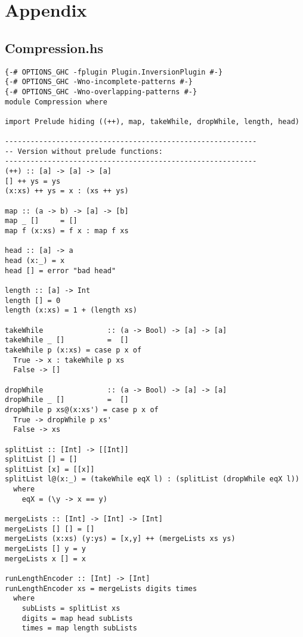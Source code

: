 \newpage

\section{Appendix}

\subsection{Compression.hs}
\label{A:comp}

\begin{verbatim}
{-# OPTIONS_GHC -fplugin Plugin.InversionPlugin #-}
{-# OPTIONS_GHC -Wno-incomplete-patterns #-}
{-# OPTIONS_GHC -Wno-overlapping-patterns #-}
module Compression where

import Prelude hiding ((++), map, takeWhile, dropWhile, length, head)

-----------------------------------------------------------
-- Version without prelude functions:
-----------------------------------------------------------
(++) :: [a] -> [a] -> [a]
[] ++ ys = ys
(x:xs) ++ ys = x : (xs ++ ys)

map :: (a -> b) -> [a] -> [b]
map _ []     = []
map f (x:xs) = f x : map f xs

head :: [a] -> a
head (x:_) = x
head [] = error "bad head"

length :: [a] -> Int
length [] = 0
length (x:xs) = 1 + (length xs)

takeWhile               :: (a -> Bool) -> [a] -> [a]
takeWhile _ []          =  []
takeWhile p (x:xs) = case p x of
  True -> x : takeWhile p xs
  False -> []

dropWhile               :: (a -> Bool) -> [a] -> [a]
dropWhile _ []          =  []
dropWhile p xs@(x:xs') = case p x of
  True -> dropWhile p xs'
  False -> xs

splitList :: [Int] -> [[Int]]
splitList [] = []
splitList [x] = [[x]]
splitList l@(x:_) = (takeWhile eqX l) : (splitList (dropWhile eqX l))
  where
    eqX = (\y -> x == y)

mergeLists :: [Int] -> [Int] -> [Int]
mergeLists [] [] = []
mergeLists (x:xs) (y:ys) = [x,y] ++ (mergeLists xs ys)
mergeLists [] y = y
mergeLists x [] = x

runLengthEncoder :: [Int] -> [Int]
runLengthEncoder xs = mergeLists digits times
  where
    subLists = splitList xs
    digits = map head subLists
    times = map length subLists
\end{verbatim}



